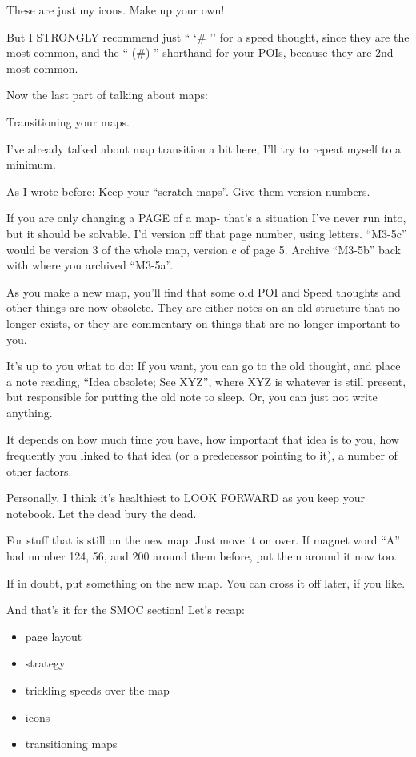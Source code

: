 \documentclass[oneside]{book}
\begin{document}
These are just my icons. Make up your own!

But I STRONGLY recommend just `` `\# '' for a speed thought, since they
are the most common, and the `` (\#) '' shorthand for your POIs, because
they are 2nd most common.


Now the last part of talking about maps:

Transitioning your maps.

I've already talked about map transition a bit here, I'll try to
repeat myself to a minimum.

As I wrote before: Keep your ``scratch maps''. Give them version
numbers.

If you are only changing a PAGE of a map- that's a situation I've
never run into, but it should be solvable. I'd version off that page
number, using letters. ``M3-5c'' would be version 3 of the whole map,
version c of page 5. Archive ``M3-5b'' back with where you archived
``M3-5a''.

As you make a new map, you'll find that some old POI and Speed
thoughts and other things are now obsolete. They are either notes on
an old structure that no longer exists, or they are commentary on
things that are no longer important to you.

It's up to you what to do: If you want, you can go to the old thought,
and place a note reading, ``Idea obsolete; See XYZ'', where XYZ is
whatever is still present, but responsible for putting the old note to
sleep. Or, you can just not write anything.

It depends on how much time you have, how important that idea is to
you, how frequently you linked to that idea (or a predecessor pointing
to it), a number of other factors.

Personally, I think it's healthiest to LOOK FORWARD as you keep your
notebook. Let the dead bury the dead.

For stuff that is still on the new map: Just move it on over. If
magnet word ``A'' had number 124, 56, and 200 around them before, put
them around it now too.

If in doubt, put something on the new map. You can cross it off later,
if you like.

And that's it for the SMOC section! Let's recap:

\begin{itemize}
\item page layout
\item strategy
\item trickling speeds over the map
\item icons
\item transitioning maps
\end{itemize}
\end{document}
